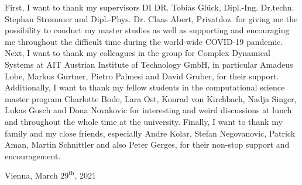 
First, I want to thank my supervisors DI DR. Tobias Gl\"uck, Dipl.-Ing. Dr.techn. Stephan Strommer and  Dipl.-Phys. Dr. Claas Abert, Privatdoz. for giving me the possibility to conduct my master studies as well as supporting and encouraging me throughout the difficult time during the world-wide COVID-19 pandemic. Next, I want to thank my colleagues in the group for Complex Dynamical Systems at AIT Austrian Institute of Technology GmbH, in particular Amadeus Lobe, Markus Gurtner, Pietro Palmesi and David Gruber, for their support. Additionally, I want to thank my fellow students in the computational science master program Charlotte Bode, Lara Ost, Konrad von Kirchbach, Nadja Singer, Lukas Gosch and Dona Novakovic for interesting and weird discussions at lunch and throughout the whole time at the university. Finally, I want to thank my family and my close friends, especially Andre Kolar, Stefan Negovanovic, Patrick Aman, Martin Schnittler and also Peter Gerges, for their non-stop support and encouragement.


\vspace{\baselineskip}
\noindent Vienna, March $29^{\text{th}}$, 2021